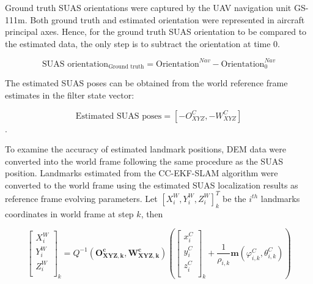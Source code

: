 Ground truth SUAS orientations were captured by the UAV navigation
unit GS-111m. Both ground truth and estimated orientation were
represented in aircraft principal axes. Hence, for the ground truth
SUAS orientation to be compared to the estimated data, the only step
is to subtract the orientation at time 0.

$$\text{SUAS orientation}_{\text{Ground truth}} =
\text{Orientation}^{Nav} - \text{Orientation}^{Nav}_0$$

The estimated SUAS poses can be obtained from the world reference
frame estimates in the filter state vector:

$$ \text{Estimated SUAS poses} = 
[-O_{XYZ}^{C}, -W_{XYZ}^{C}]$$.


To examine the accuracy of estimated landmark positions, DEM data were
converted into the world frame following the same procedure as the SUAS
position. Landmarks estimated from the CC-EKF-SLAM algorithm were
converted to the world frame using the estimated SUAS localization results
as reference frame evolving parameters. Let $[X_i^W,Y_i^W,
Z_i^W]^T_k$ be the $i^{th}$ landmarks coordinates in world frame at
step $k$, then

\begin{equation}
  \left[ \begin{array}{c}
    X_{i}^{W}  \\
    Y_{i}^{W}  \\
    Z_{i}^{W}  \\
  \end{array} \right]_k=Q^{-1}(\boldsymbol{O_{XYZ, k}^{c}}, \boldsymbol{W_{XYZ,k}^{c}})\left(\left[
    \begin{array}{c}
      x_{i}^{C} \\
      y_{i}^{C} \\
      z_{i}^{C} \\
    \end{array}
  \right]_k+\frac{1}{\rho _{i,k}}\boldsymbol{m}(\varphi_{i,k}^{C},\theta_{i,k}^{C})\right)
\end{equation}

